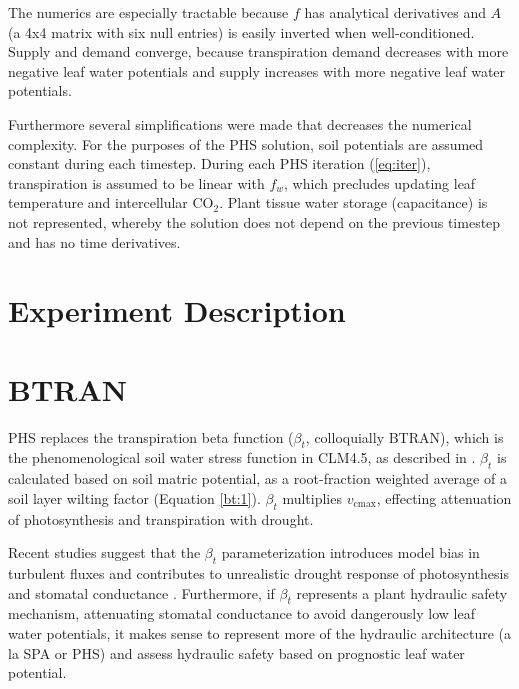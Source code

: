 \documentclass[draft,linenumbers]{agujournal}
\begin{document}
    The numerics are especially tractable because $f$ has analytical derivatives and $A$ 
    (a 4x4 matrix with six null entries) is easily inverted when well-conditioned. 
    Supply and demand converge, because transpiration demand decreases with more negative 
    leaf water potentials and supply increases with more negative leaf water potentials.
    
    Furthermore several simplifications were made that decreases the numerical complexity.
    For the purposes of the PHS solution, soil potentials are assumed constant during each timestep.
    During each PHS iteration (\ref{eq:iter}), transpiration is assumed to be linear with $f_w$,
    which precludes updating leaf temperature and intercellular CO$_2$.
    Plant tissue water storage (capacitance) is not represented, whereby the solution does not
    depend on the previous timestep and has no time derivatives.

\section{Experiment Description}
    
    
    

\section{BTRAN}
\label{sect:btran}
    PHS replaces the transpiration beta function ($\beta_t$, colloquially BTRAN), 
    which is the phenomenological soil water stress function in CLM4.5, as described in \citet{oleson2013,sellers1996a,sellers1996b}.
    $\beta_t$ is calculated based on soil matric potential, as a root-fraction weighted average of a soil layer wilting factor (Equation \ref{bt:1}).
    $\beta_t$ multiplies $v_{\text{cmax}}$, effecting attenuation of photosynthesis and transpiration with drought.
    
    Recent studies suggest that the $\beta_t$ parameterization introduces model bias in turbulent fluxes \citep{bonan2014}
    and contributes to unrealistic drought response of photosynthesis and stomatal conductance  \citep{powell2013}.
    Furthermore, if $\beta_t$ represents a plant hydraulic safety mechanism, attenuating stomatal conductance to avoid
    dangerously low leaf water potentials, it makes sense to represent more of the hydraulic architecture (a la SPA or PHS)
    and assess hydraulic safety based on prognostic leaf water potential.
    
\end{document}
